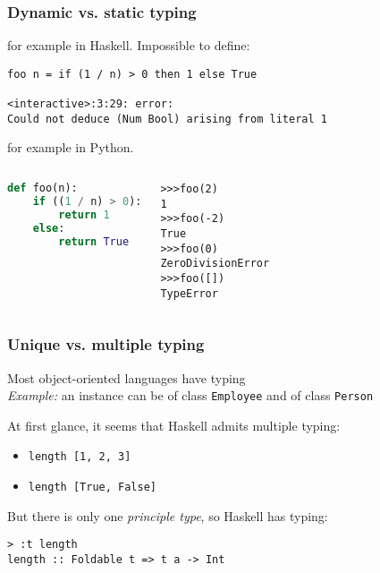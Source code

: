 \documentclass{beamer}
\begin{document}
\begin{frame}[fragile]\frametitle{Dynamic vs. static typing}

   for example in Haskell. Impossible to define:
  \begin{lstlisting}
foo n = if (1 / n) > 0 then 1 else True

<interactive>:3:29: error:
Could not deduce (Num Bool) arising from literal 1
  \end{lstlisting}
  
  \vspace{2mm}
   for example in Python.
  \vspace{-5mm}
  \begin{columns}[t]
  \begin{lstlisting}[language=python]
def foo(n):
    if ((1 / n) > 0):
        return 1
    else:
        return True
      \end{lstlisting}
      \begin{alltt}
>>> foo(2)
1
>>> foo(-2)
True
>>> foo(0)
ZeroDivisionError
>>> foo([])
TypeError
      \end{alltt}
    \end{columns}

\end{frame}

\begin{frame}[fragile]\frametitle{Unique vs. multiple typing}

  Most object-oriented languages have  typing\\
  \emph{Example:} an instance can be of class \texttt{Employee} and of class
  \texttt{Person}

  \vspace{5mm}
  At first glance, it seems that Haskell admits multiple typing:
  \begin{itemize}
  \item \texttt{length [1, 2, 3]}
  \item \texttt{length [True, False]}
  \end{itemize}

  But there is only one \emph{principle type}, so Haskell has 
  typing:
  \begin{lstlisting}
> :t length
length :: Foldable t => t a -> Int
\end{lstlisting}

\end{frame}
\end{document}
